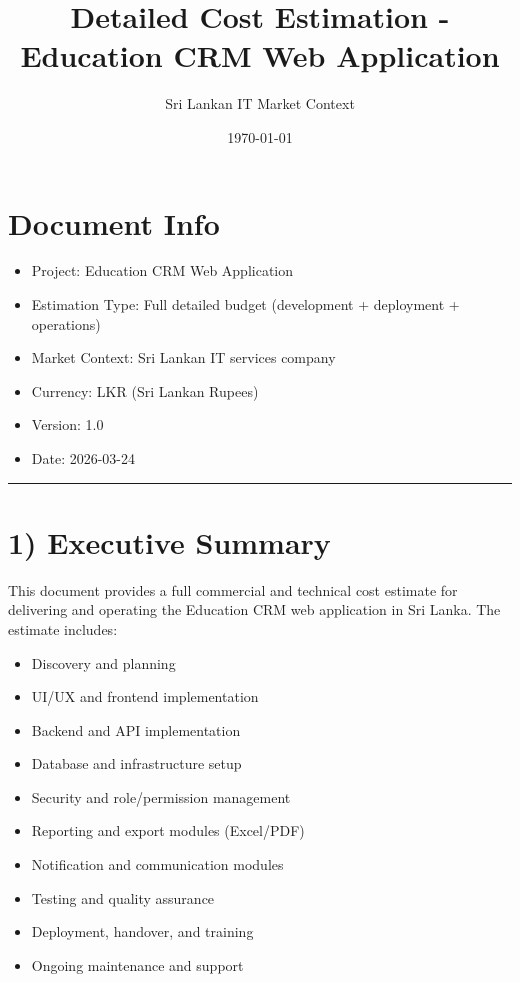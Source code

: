 \documentclass[11pt,a4paper]{article}
\title{Detailed Cost Estimation - Education CRM Web Application}
\author{Sri Lankan IT Market Context}
\date{\today}
\begin{document}
\maketitle
\tableofcontents
\newpage

\section{Document Info}

\begin{itemize}
\item Project: Education CRM Web Application
\item Estimation Type: Full detailed budget (development + deployment + operations)
\item Market Context: Sri Lankan IT services company
\item Currency: LKR (Sri Lankan Rupees)
\item Version: 1.0
\item Date: 2026-03-24
\end{itemize}

\bigskip\hrule\bigskip

\section{1) Executive Summary}

This document provides a full commercial and technical cost estimate for delivering and operating the Education CRM web application in Sri Lanka. The estimate includes:\\

\begin{itemize}
\item Discovery and planning
\item UI/UX and frontend implementation
\item Backend and API implementation
\item Database and infrastructure setup
\item Security and role/permission management
\item Reporting and export modules (Excel/PDF)
\item Notification and communication modules
\item Testing and quality assurance
\item Deployment, handover, and training
\item Ongoing maintenance and support
\end{itemize}
\end{document}
